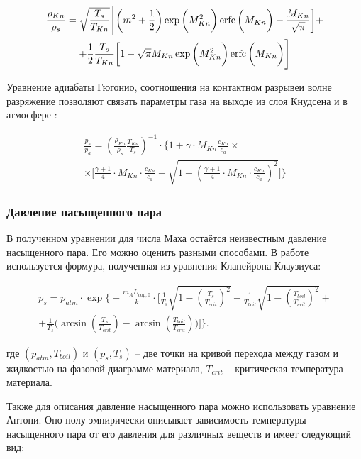 \begin{multline}
\label{eq:densjump}
    \frac{\rho_{Kn}}{\rho_s} = \sqrt{\frac{T_s}{T_{Kn}}} \Bigg[ \bigg( m^2 + \frac{1}{2} \bigg) \exp\bigg(M_{Kn}^2\bigg)\operatorname{erfc}\bigg(M_{Kn}\bigg) - \frac{M_{Kn}}{\sqrt{\pi}} \bigg] + \\ + \frac{1}{2} \frac{T_s}{T_{Kn}} \bigg[ 1 - \sqrt{\pi}M_{Kn}\exp\bigg(M_{Kn}^2\bigg)\operatorname{erfc}\bigg(M_{Kn}\bigg) \Bigg]
\end{multline}

Уравнение адиабаты Гюгонио, соотношения на контактном разрывеи волне разряжение позволяют связать параметры газа на выходе из слоя Кнудсена и в атмосфере \cite{klassen2018simulation}:

\begin{multline}
\label{eq:rh}
    \frac{p_s}{p_a} = \left( \frac{\rho_{Kn}}{\rho_s} \frac{T_{Kn}}{T_s} \right)^{-1} \cdot \Bigg\{1 + \gamma \cdot M_{Kn} \frac{c_{Kn}}{c_a} \times \\ \times \Bigg[ \frac{\gamma + 1}{4} \cdot M_{Kn} \cdot \frac{c_{Kn}}{c_a} + \sqrt{1 + \left( \frac{\gamma + 1}{4} \cdot M_{Kn} \cdot \frac{c_{Kn}}{c_a} \right)^2} \Bigg] \Bigg\}
\end{multline}

\subsubsection{Давление насыщенного пара}

В полученном уравнении для числа Маха остаётся неизвестным давление насыщенного пара. Его можно оценить разными способами. В работе \cite{klassen2018simulation} используется формура, полученная из уравнения Клапейрона-Клаузиуса:

\begin{multline}
\label{eq:cc}
    p_s = p_{atm}\cdot\exp \Bigg\{ -\frac{m_A L_{vap,0}}{k} \cdot \Bigg[ \frac{1}{T_s} \sqrt{1 - \left( \frac{T_s}{T_{crit}} \right)^2} - \frac{1}{T_{boil}} \sqrt{1 - \left( \frac{T_{boil}}{T_{crit}} \right)^2} + \\ + \frac{1}{T_s} \bigg( \arcsin \left( \frac{T_s}{T_{crit}} \right) - \arcsin\left(\frac{T_{boil}}{T_{crit}} \right)\bigg) \Bigg] \Bigg\}.
\end{multline}

\noindent
где $(p_{atm}, T_{boil})$ и $(p_{s}, T_{s})$ -- две точки на кривой перехода между газом и жидкостью на фазовой диаграмме материала, $T_{crit}$ -- критическая температура материала.

Также для описания давление насыщенного пара можно использовать уравнение Антони. Оно полу эмпирически описывает зависимость температуры насыщенного пара от его давления для различных веществ и имеет следующий вид:

